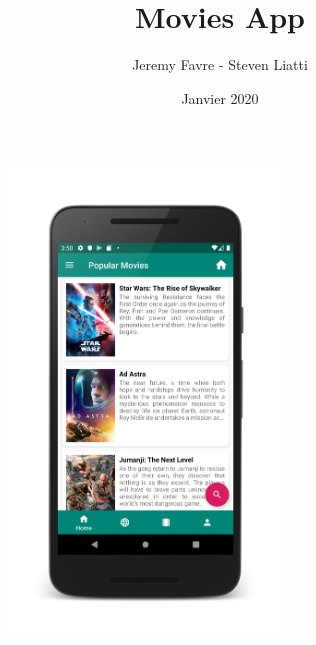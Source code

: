 \documentclass[a4paper, 12pt]{article}
\begin{document}
\title{Movies App}
\author{Jeremy Favre - Steven Liatti}
\date{Janvier 2020}
\maketitle
\begin{figure}
    \begin{center}
        \includegraphics[width=0.65\textwidth]{img/screenshots/movie_list_framed.png}
    \end{center}
\end{figure}
\newpage


\tableofcontents
{}
\listoffigures
\newpage
\renewcommand\listoflistingscaption{Table des listings de code source}
\listoflistings
\end{document}
